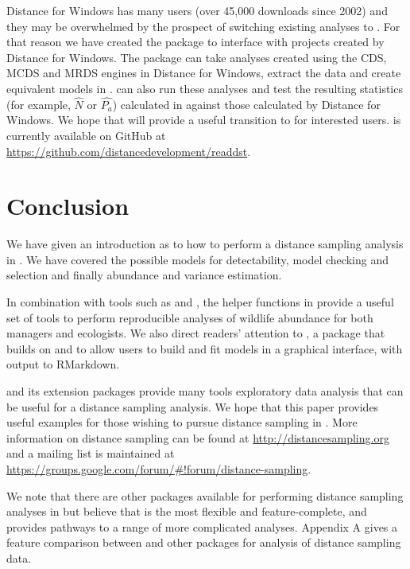 \documentclass[article]{jss}
\begin{document}
Distance for Windows has many users (over 45,000 downloads since 2002) and they may be overwhelmed by the prospect of switching existing analyses to . For that reason we have created the  \citep{readdst-pkg} package to interface with projects created by Distance for Windows. The package can take analyses created using the CDS, MCDS and MRDS engines in Distance for Windows, extract the data and create equivalent models in .  can also run these analyses and test the resulting statistics (for example, $\hat{N}$ or $\hat{P_a}$) calculated in  against those calculated by Distance for Windows. We hope that  will provide a useful transition to  for interested users.  is currently available on GitHub at \url{https://github.com/distancedevelopment/readdst}.

\section{Conclusion}

We have given an introduction as to how to perform a distance sampling analysis in . We have covered the possible models for detectability, model checking and selection and finally abundance and variance estimation.

In combination with tools such as  and  \citep{rmarkdown-pkg}, the helper functions in  provide a useful set of tools to perform reproducible analyses of wildlife abundance for both managers and ecologists. We also direct readers' attention to  \citep{dsshiny-pkg}, a package that builds on  \citep{shiny-pkg} and  to allow users to build and fit models in a graphical interface, with output to RMarkdown.

 and its extension packages provide many tools exploratory data analysis that can be useful for a distance sampling analysis. We hope that this paper provides useful examples for those wishing to pursue distance sampling in . More information on distance sampling can be found at \url{http://distancesampling.org} and a mailing list is maintained at \url{https://groups.google.com/forum/#!forum/distance-sampling}.

We note that there are other packages available for performing distance sampling analyses in  but believe that  is the most flexible and feature-complete, and provides pathways to a range of more complicated analyses. Appendix A gives a feature comparison between  and other  packages for analysis of distance sampling data.
\end{document}
